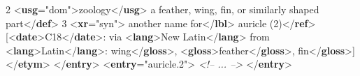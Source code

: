 \begin{shaded}
\mbox{}\newline 
{}2 {<\textbf{usg}\hspace*{1em}{type}="{dom}">}zoology{</\textbf{usg}>}\mbox{}\newline 
\hspace*{1em}a feather, wing, fin, or similarly shaped part{</\textbf{def}>}\mbox{}\newline 
{}\mbox{}\newline 
{}3 {<\textbf{xr}\hspace*{1em}{type}="{syn}">}\mbox{}\newline 
\hspace*{1em}\hspace*{1em}another name for{</\textbf{lbl}>}\mbox{}\newline 
\hspace*{1em}\hspace*{1em}auricle (2){</\textbf{ref}>}\mbox{}\newline 
\hspace*{1em}\mbox{}\newline 
{}\mbox{}\newline 
{}[{<\textbf{date}>}C18{</\textbf{date}>}: via {<\textbf{lang}>}New Latin{</\textbf{lang}>} from {<\textbf{lang}>}Latin{</\textbf{lang}>}:\mbox{}\newline 
{}wing{</\textbf{gloss}>}, {<\textbf{gloss}>}feather{</\textbf{gloss}>},\mbox{}\newline 
{}fin{</\textbf{gloss}>}]{</\textbf{etym}>}\mbox{}\newline 
{</\textbf{entry}>}\mbox{}\newline 
{<\textbf{entry}\hspace*{1em}{xml:id}="{auricle.2}">}\mbox{}\newline 
{}\mbox{}\newline 
\textit{<!-- ... -->}\mbox{}\newline 
{}\mbox{}\newline 
{</\textbf{entry}>}\end{shaded}\egroup\par \par
